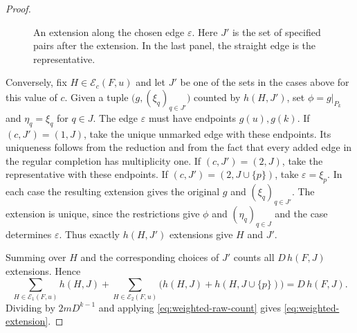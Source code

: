 \documentclass[preprint,11pt,numbers]{elsarticle-arxiv}
\numberwithin{equation}{section}
\theoremstyle{definition}
\begin{document}
\begin{proof}
\begin{figure}[htbp]
\centering
{}
\caption{An extension along the chosen edge $\varepsilon$. Here
$J'$ is the set of specified pairs after the extension. In the last panel,
the straight edge is the representative.}
\label{fig:weighted-extension-choices}
\end{figure}

Conversely, fix $H\in\mathcal E_c(F,u)$ and let $J'$ be one of the
sets in the cases above for this value of $c$. Given a tuple
$\bigl(g,(\xi_q)_{q\in J'}\bigr)$ counted by $h(H,J')$, set
$\phi=g|_{P_k}$ and $\eta_q=\xi_q$ for $q\in J$. The edge
$\varepsilon$ must have endpoints $g(u),g(k)$. If $(c,J')=(1,J)$,
take the unique unmarked edge with these endpoints. Its uniqueness
follows from the reduction and from the fact that every added edge
in the regular completion has multiplicity one. If $(c,J')=(2,J)$,
take the representative with these endpoints. If
$(c,J')=(2,J\cup\{p\})$, take $\varepsilon=\xi_p$. In each case
the resulting extension gives the original $g$ and $(\xi_q)_{q\in J'}$.
The extension is unique, since the restrictions give $\phi$ and
$(\eta_q)_{q\in J}$ and the case determines $\varepsilon$.
Thus exactly $h(H,J')$ extensions give $H$ and $J'$.

Summing over $H$ and the corresponding choices of $J'$ counts all
$D\,h(F,J)$ extensions. Hence
\[
 \sum_{H\in\mathcal E_1(F,u)}h(H,J)
 +\sum_{H\in\mathcal E_2(F,u)}
     \bigl(h(H,J)+h(H,J\cup\{p\})\bigr)=D\,h(F,J).
\]
Dividing by $2mD^{k-1}$ and applying \eqref{eq:weighted-raw-count}
gives \eqref{eq:weighted-extension}.
\end{proof}
\end{document}
